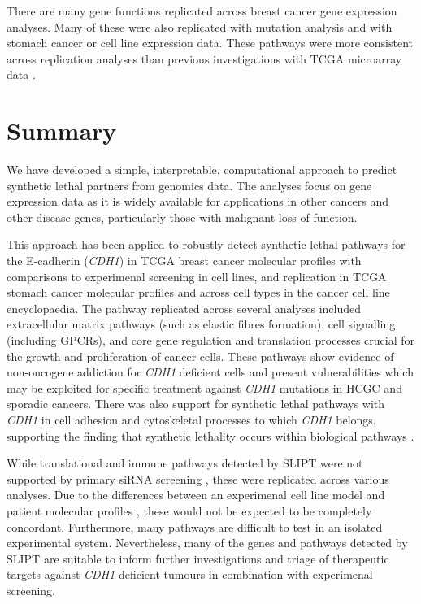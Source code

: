 There are many gene functions replicated across breast cancer gene expression analyses. Many of these were also replicated with mutation analysis and with stomach cancer or cell line expression data. These pathways were more consistent across replication analyses than previous investigations with TCGA microarray data \cite{Kelly2013}.   

\section{Summary}

We have developed a simple, interpretable, computational approach to predict synthetic lethal partners from genomics data. The analyses focus on gene expression data as it is widely available for applications in other cancers and other disease genes, particularly those with malignant loss of function.

This approach has been applied to robustly detect synthetic lethal pathways for the E-cadherin (\textit{CDH1}) in TCGA breast cancer molecular profiles with comparisons to experimenal screening \citep{Telford2015} in cell lines, and replication in TCGA stomach cancer molecular profiles and across cell types in the cancer cell line encyclopaedia. The pathway replicated across several analyses included extracellular matrix pathways (such as elastic fibres formation), cell signalling (including GPCRs), and core gene regulation and translation processes crucial for the growth and proliferation of cancer cells. These pathways show evidence of non-oncogene addiction for \textit{CDH1} deficient cells and present vulnerabilities which may be exploited for specific treatment against \textit{CDH1} mutations in HCGC and sporadic cancers. There was also support for synthetic lethal pathways with \textit{CDH1} in cell adhesion and cytoskeletal processes to which \textit{CDH1} belongs, supporting the finding that synthetic lethality occurs within biological pathways \citep{Kelley2005, Boone2007}.

While translational and immune pathways detected by SLIPT were not supported by primary siRNA screening \citep{Telford2015}, these were replicated across various analyses. Due to the differences between an experimenal cell line model \citep{Barretina2012, Chen2014, Fece2015} and patient molecular profiles \citep{TCGA2012, TCGA2014GC}, these would not be expected to be completely concordant. Furthermore, many pathways are difficult to test in an isolated experimental system. Nevertheless, many of the genes and pathways detected by SLIPT are suitable to inform further investigations and triage of therapeutic targets against \textit{CDH1} deficient tumours in combination with experimenal screening.  


